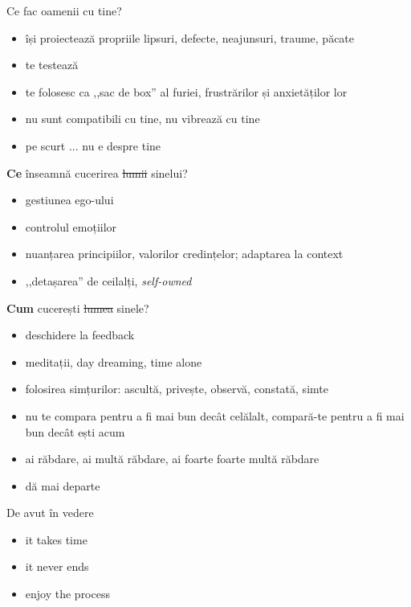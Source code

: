 \documentclass{simple}
\begin{document}
\begin{frame}{Ce fac oamenii cu tine?}
  \begin{itemize}
    \pause \item își proiectează propriile lipsuri, defecte, neajunsuri, traume, păcate
    \pause \item te testează
    \pause \item te folosesc ca ,,sac de box'' al furiei, frustrărilor și anxietăților lor
    \pause \item nu sunt compatibili cu tine, nu vibrează cu tine
    \pause \item pe scurt ... nu e despre tine
  \end{itemize}
\end{frame}

\begin{frame}{\textbf{Ce} înseamnă cucerirea \sout{lumii} sinelui?}
  \begin{itemize}
    \pause \item gestiunea ego-ului
    \pause \item controlul emoțiilor
    \pause \item nuanțarea principiilor, valorilor credințelor; adaptarea la context
    \pause \item ,,detașarea'' de ceilalți, \textit{self-owned}
  \end{itemize}
\end{frame}

\begin{frame}{\textbf{Cum} cucerești \sout{lumea} sinele?}
  \begin{itemize}
    \pause \item deschidere la feedback
    \pause \item meditații, day dreaming, time alone
    \pause \item folosirea simțurilor: ascultă, privește, observă, constată, simte
    \pause \item nu te compara pentru a fi mai bun decât celălalt, compară-te pentru a fi mai bun decât ești acum
    \pause \item ai răbdare, ai multă răbdare, ai foarte foarte multă răbdare
    \pause \item dă mai departe
  \end{itemize}
\end{frame}

\begin{frame}{De avut în vedere}
  \begin{itemize}
    \pause \item it takes time
    \pause \item it never ends
    \pause \item enjoy the process
  \end{itemize}
\end{frame}
\end{document}
